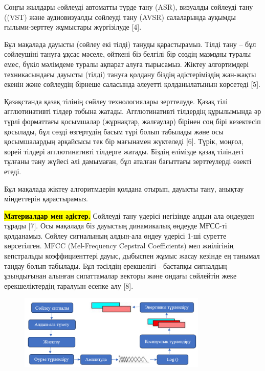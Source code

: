 Соңғы жылдары cөйлеуді автоматты түрде тану (ASR), визуалды сөйлеуді
тану ((VST) және аудиовизуалды сөйлеуді тану (AVSR) салаларында ауқымды
ғылыми-зерттеу жұмыстары жүргізілуде {[}4{]}.

Бұл мақалада дауысты (сөйлеу екі тілді) тануды қарастырамыз. Тілді тану
-- бұл сөйлеушіні тануға ұқсас мәселе, өйткені біз белгілі бір сөздің
мазмұны туралы емес, бүкіл мәлімдеме туралы ақпарат алуға тырысамыз.
Жіктеу алгортимдері техникасындағы дауысты (тілді) тануға қолдану біздің
әдістеріміздің жан-жақты екенін және сөйлеудің бірнеше саласында
әлеуетті қолданылатынын көрсетеді {[}5{]}.

Қазақстанда қазақ тілінің сөйлеу технологиялары зерттелуде. Қазақ тілі
агглютинативті тілдер тобына жатады. Агглютинативті тілдердің
құрылымында әр түрлі форматтағы қосымшалар (жұрнақтар, жалғаулар)
бірінен соң бірі кезектесіп қосылады, бұл сөзді өзгертудің басым түрі
болып табылады және осы қосымшалардың әрқайсысы тек бір мағынамен
жүктеледі {[}6{]}. Түрік, моңғол, корей тілдері агглютинативті тілдерге
жатады. Біздің елімізде қазақ тіліндегі тұлғаны тану жүйесі әлі
дамымаған, бұл аталған бағыттағы зерттеулерді өзекті етеді.

Бұл мақалада жіктеу алгоритмдерін қолдана отырып, дауысты тану, анықтау
міндеттерін қарастырамыз.

{\bfseries \hl{Материалдар мен әдістер.}} Сөйлеуді тану үдерісі негізінде
алдын ала өңдеуден тұрады {[}7{]}. Осы мақалада біз дауыстың динамикалық
өңдеуде МҒСС-ті қолданамыз. Сөйлеу сигналының алдын-ала өңдеу үдерісі
1-ші суретте көрсетілген. MFCC (Mel-Frequency Cepstral Coefficients) мел
жиілігінің кепстральды коэффициенттері дауыс, дыбыспен жұмыс жасау
кезінде ең танымал таңдау болып табылады. Бұл тәсілдің ерекшелігі -
бастапқы сигналдың ұзындығынан алынған сипаттамалар векторы және ондағы
сөйлейтін жеке ерекшеліктердің таралуын есепке алу {[}8{]}.

\begin{figure}[H]
	\centering
	\includegraphics[width=0.8\textwidth]{media/ict/image5}
	\caption*{}
\end{figure}


